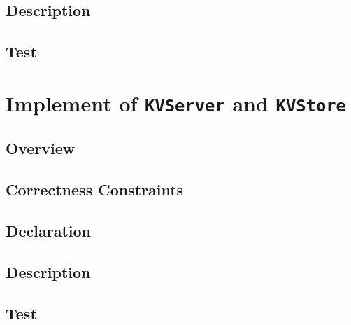 \documentclass{article}
\begin{document}
\subsection{Description}
\subsection{Test}

\section{Implement of \texttt{KVServer} and \texttt{KVStore}}
\subsection{Overview}
\subsection{Correctness Constraints}
\subsection{Declaration}
\subsection{Description}
\subsection{Test}
\end{document}
